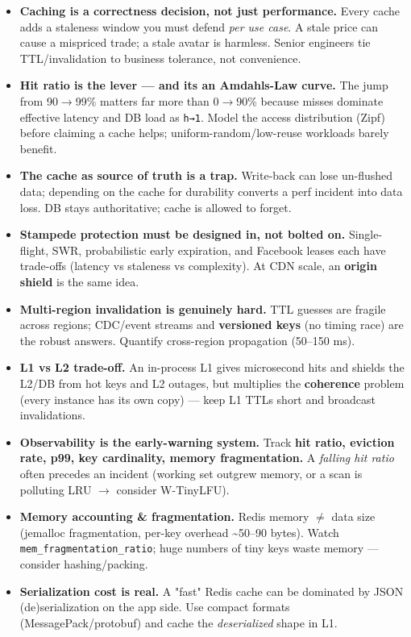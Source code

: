 \documentclass[11pt]{article}
\providecommand{\tightlist}{\setlength{\itemsep}{1pt}\setlength{\parskip}{0pt}}
\begin{document}
\begin{itemize}
\tightlist
\item
  \textbf{Caching is a correctness decision, not just performance.} Every cache adds a staleness window you must defend \emph{per use case}. A stale price can cause a mispriced trade; a stale avatar is harmless. Senior engineers tie TTL/invalidation to business tolerance, not convenience.
\item
  \textbf{Hit ratio is the lever --- and it\textquotesingle s an Amdahl\textquotesingle s-Law curve.} The jump from 90\(\rightarrow\)99\% matters far more than 0\(\rightarrow\)90\% because misses dominate effective latency and DB load as \texttt{h→1}. Model the access distribution (Zipf) before claiming a cache helps; uniform-random/low-reuse workloads barely benefit.
\item
  \textbf{The cache as source of truth is a trap.} Write-back can lose un-flushed data; depending on the cache for durability converts a perf incident into data loss. DB stays authoritative; cache is allowed to forget.
\item
  \textbf{Stampede protection must be designed in, not bolted on.} Single-flight, SWR, probabilistic early expiration, and Facebook leases each have trade-offs (latency vs staleness vs complexity). At CDN scale, an \textbf{origin shield} is the same idea.
\item
  \textbf{Multi-region invalidation is genuinely hard.} TTL guesses are fragile across regions; CDC/event streams and \textbf{versioned keys} (no timing race) are the robust answers. Quantify cross-region propagation (50--150 ms).
\item
  \textbf{L1 vs L2 trade-off.} An in-process L1 gives microsecond hits and shields the L2/DB from hot keys and L2 outages, but multiplies the \textbf{coherence} problem (every instance has its own copy) --- keep L1 TTLs short and broadcast invalidations.
\item
  \textbf{Observability is the early-warning system.} Track \textbf{hit ratio, eviction rate, p99, key cardinality, memory fragmentation.} A \emph{falling hit ratio} often precedes an incident (working set outgrew memory, or a scan is polluting LRU \(\rightarrow\) consider W-TinyLFU).
\item
  \textbf{Memory accounting \& fragmentation.} Redis memory \(\neq\) data size (jemalloc fragmentation, per-key overhead \textasciitilde50--90 bytes). Watch \texttt{mem\_fragmentation\_ratio}; huge numbers of tiny keys waste memory --- consider hashing/packing.
\item
  \textbf{Serialization cost is real.} A "fast" Redis cache can be dominated by JSON (de)serialization on the app side. Use compact formats (MessagePack/protobuf) and cache the \emph{deserialized} shape in L1.
\end{itemize}
\end{document}
